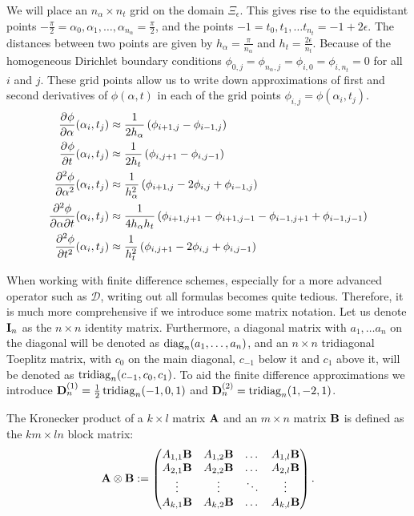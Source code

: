 We will place an $n_\alpha \times n_t$ grid on the domain $\Xi_\epsilon$. This gives rise to the equidistant points $-\frac{\pi}{2}=\alpha_0, \alpha_1, \dots, \alpha_{n_\alpha} = \frac{\pi}{2}$, and the points $-1 = t_0, t_1, \dots t_{n_t} = -1 + 2\epsilon$. The distances between two points are given by $h_\alpha = \frac{\pi}{n_\alpha}$ and $h_t = \frac{2\epsilon}{n_t}$. Because of the homogeneous Dirichlet boundary conditions $\phi_{0,j} = \phi_{n_\alpha,j} = \phi_{i, 0} = \phi_{i,n_t} = 0$ for all $i$ and $j$. These grid points allow us to write down approximations of first and second derivatives of $\phi(\alpha, t)$ in each of the grid points $\phi_{i, j} = \phi(\alpha_i, t_j)$.
\begin{align*}
  {\pdv[]{\phi}{\alpha}}(\alpha_i, t_j)    & \approx \frac{1}{2h_\alpha}\left( \phi_{i+1,j} - \phi_{i-1,j} \right)                                           \\
  {\pdv[]{\phi}{t}}(\alpha_i, t_j)         & \approx \frac{1}{2h_t}\left( \phi_{i,j+1} - \phi_{i,j-1} \right)                                                \\
  {\pdv[2]{\phi}{\alpha}}(\alpha_i, t_j)   & \approx \frac{1}{h_\alpha^2}\left( \phi_{i+1,j} - 2 \phi_{i,j} + \phi_{i-1,j} \right)                           \\
  {\pdv[]{\phi}{\alpha}{t}}(\alpha_i, t_j) & \approx \frac{1}{4h_\alpha h_t}\left( \phi_{i+1,j+1} - \phi_{i+1,j-1} - \phi_{i-1,j+1} + \phi_{i-1,j-1} \right) \\
  {\pdv[2]{\phi}{t}}(\alpha_i, t_j)        & \approx \frac{1}{h_t^2}\left( \phi_{i,j+1} - 2 \phi_{i,j} + \phi_{i,j-1} \right)
\end{align*}

When working with finite difference schemes, especially for a more  advanced operator such as $\mathcal{D}$, writing out all formulas becomes quite tedious. Therefore, it is much more comprehensive if we introduce some matrix notation. Let us denote $\vb{I}_n$ as the $n \times n$ identity matrix. Furthermore, a diagonal matrix with $a_1, \dots a_n$ on the diagonal will be denoted as $\operatorname{diag}_n(a_1, \dots, a_n)$, and an $n \times n$ tridiagonal Toeplitz matrix, with $c_{0}$ on the main diagonal, $c_{-1}$ below it and $c_1$ above it, will be denoted as $\operatorname{tridiag}_{n}(c_{-1}, c_{0}, c_1)$. To aid the finite difference approximations we introduce $\vb{D}^{(1)}_n = \frac{1}{2}\operatorname{tridiag}_n(-1,0,1)$ and $\vb{D}^{(2)}_n = \operatorname{tridiag}_n(1,-2,1)$.

The Kronecker product of a $k \times l$ matrix $\vb{A}$ and an $m \times n$ matrix $\vb{B}$ is defined as the $km \times ln$ block matrix:
$$
  \vb{A} \otimes \vb{B} := \begin{pmatrix}
    A_{1,1} \vb{B} & A_{1, 2} \vb{B} & \dots  & A_{1, l} \vb{B} \\
    A_{2,1} \vb{B} & A_{2, 2} \vb{B} & \dots  & A_{2, l} \vb{B} \\
    \vdots         & \vdots          & \ddots & \vdots          \\
    A_{k,1} \vb{B} & A_{k, 2} \vb{B} & \dots  & A_{k, l} \vb{B}
  \end{pmatrix}{}\text{.}
$$

